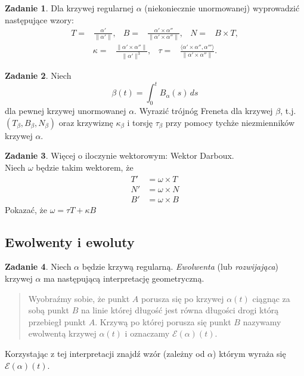 \documentclass[a4paper,11pt]{article}
\theoremstyle{definition}\newtheorem{exercise}{Zadanie}
\theoremstyle{definition}\newtheorem{remark}{Uwaga}
\begin{document}
\begin{exercise}
Dla krzywej regularnej $\alpha$ (niekoniecznie unormowanej) wyprowadzić 
następujące wzory:
\begin{align*}
 T=& \frac{\alpha'}{\|\alpha'\|},& 
B=& \frac{\alpha'\times \alpha''}{\|\alpha'\times 
\alpha''\|}, & N=& B\times T,
\end{align*}
\begin{align*}
\kappa=&\frac{\|\alpha'\times \alpha''\|}{\|\alpha'\|^{3}}, & 
\tau=&\frac{\langle \alpha'\times 
\alpha'',\alpha'''\rangle}{\|\alpha'\times \alpha''\|}.
\end{align*}
\end{exercise}

\begin{exercise}
Niech \[\beta(t)=\int_0^t B_\alpha (s)\,ds\] dla pewnej krzywej unormowanej 
$\alpha$. Wyrazić trójnóg Freneta dla krzywej $\beta$, t.j.
$\left(T_\beta,B_\beta,N_\beta\right)$ oraz krzywiznę $\kappa_\beta$ i 
torsję 
$\tau_\beta$ przy pomocy tychże niezmienników krzywej $\alpha$.
\end{exercise}


\begin{exercise}
Więcej o iloczynie wektorowym: Wektor Darboux.\\
Niech $\omega$ będzie takim wektorem, że 
\begin{align*}
T'&=\omega\times T\\
N'&=\omega\times N\\
B'&=\omega\times B
\end{align*}
Pokazać, że $\omega=\tau T+\kappa B$

\end{exercise}


\subsection{Ewolwenty i ewoluty}
\begin{exercise}
Niech $\alpha$ będzie krzywą regularną. \textit{Ewolwenta} (lub 
\textit{rozwijająca}) krzywej $\alpha$ ma następującą interpretację 
geometryczną.

\begin{quote}
Wyobraźmy sobie, że punkt $A$ porusza się po krzywej $\alpha(t)$ ciągnąc za 
sobą punkt $B$ na linie kt\'orej długość jest r\'owna długości drogi kt\'orą 
przebiegł punkt $A$. Krzywą po kt\'orej porusza się punkt $B$ nazywamy 
ewolwentą krzywej $\alpha(t)$ i oznaczamy $\mathcal{E}(\alpha)(t)$.
\end{quote}

Korzystając z tej interpretacji znajdź wz\'or (zależny od $\alpha$) kt\'orym 
wyraża się $\mathcal{E}(\alpha)(t)$.
\end{exercise}
\end{document}
